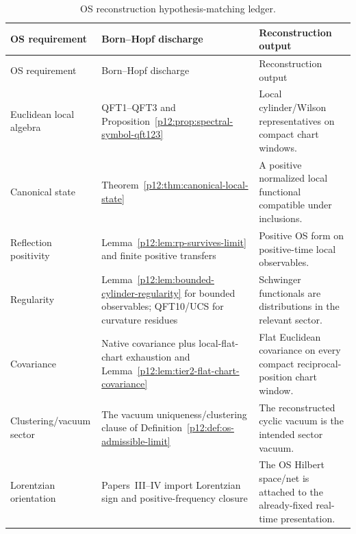 \documentclass[12pt,a4paper]{article}
\begin{document}
\begin{longtable}{>{\raggedright\arraybackslash}p{} >{\raggedright\arraybackslash}p{} >{\raggedright\arraybackslash}p{}}
\caption[OS reconstruction hypothesis-matching ledger]{OS reconstruction hypothesis-matching ledger.}\label{p12:tab:os-hypothesis-matching-ledger}\\
\toprule
OS requirement & Born--Hopf discharge & Reconstruction output \\
\midrule
\endfirsthead
\toprule
OS requirement & Born--Hopf discharge & Reconstruction output \\
\midrule
\endhead
Euclidean local algebra & QFT1--QFT3 and Proposition~\ref{p12:prop:spectral-symbol-qft123} & Local cylinder/Wilson representatives on compact chart windows. \\
Canonical state & Theorem~\ref{p12:thm:canonical-local-state} & A positive normalized local functional compatible under inclusions. \\
Reflection positivity & Lemma~\ref{p12:lem:rp-survives-limit} and finite positive transfers & Positive OS form on positive-time local observables. \\
Regularity & Lemma~\ref{p12:lem:bounded-cylinder-regularity} for bounded observables; QFT10/UCS for curvature residues & Schwinger functionals are distributions in the relevant sector. \\
Covariance & Native covariance plus local-flat-chart exhaustion and Lemma~\ref{p12:lem:tier2-flat-chart-covariance} & Flat Euclidean covariance on every compact reciprocal-position chart window. \\
Clustering/vacuum sector & The vacuum uniqueness/clustering clause of Definition~\ref{p12:def:os-admissible-limit} & The reconstructed cyclic vacuum is the intended sector vacuum. \\
Lorentzian orientation & Papers~III--IV import Lorentzian sign and positive-frequency closure & The OS Hilbert space/net is attached to the already-fixed real-time presentation. \\
\bottomrule
\end{longtable}
\end{document}
